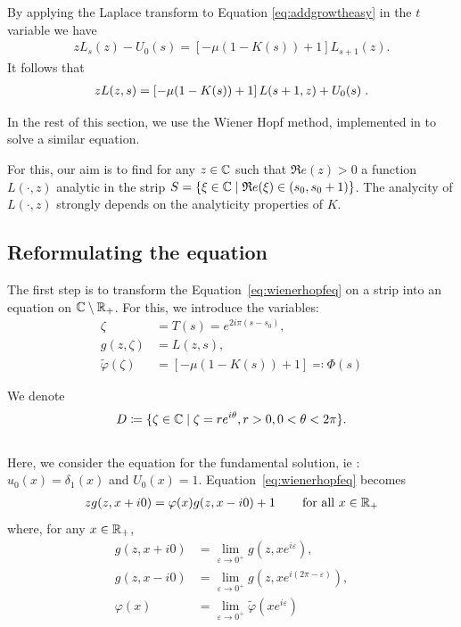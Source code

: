 \documentclass[11pt]{amsart}
\renewcommand{\Re}{\mathfrak{R}e}
\begin{document}
By applying the Laplace transform to Equation \eqref{eq:addgrowtheasy} in the $t$ variable we have 
\begin{align*}
    zL_s(z) - U_0(s) = \left[- \mu (1-K(s)) + 1\right] L_{s+1}(z).
\end{align*}
It follows that 
\begin{align}
    \label{eq:wienerhopfeq}
    zL(z,s) = \left[- \mu (1-K(s)) + 1\right] L(s+1,z) + U_0(s)
    \; .
\end{align} 


In the rest of this section, we use the Wiener Hopf method, implemented in \cite{escobedo2007fundamental} to solve a similar equation. 
\medskip

For this, our aim is to find for any $z \in \mathbb{C}$ such that $\Re(z) > 0$ a function $L(\cdot,z)$ analytic in the strip $S = \{\xi \in \CC \mid \Re(\xi) \in (s_0, s_0+1)\}$. 
The analycity of $L(\cdot,z)$ strongly depends on the analyticity properties of $K$.\\



\subsection{Reformulating the equation}

The first step is to transform the Equation~\eqref{eq:wienerhopfeq} on a strip into an equation on $\mathbb{C} \setminus \mathbb{R}_+$. For this, we introduce the variables:
    \begin{align}
        \zeta &= T(s) = e^{2i\pi(s-s_0)},\\
        g(z,\zeta) &= L(z,s), \\
        \tilde \varphi(\zeta) &= \left[- \mu (1-K(s)) + 1\right] \eqqcolon 
        \Phi(s)
        \label{def:Phi}
    \end{align}

We denote 
\begin{equation}\label{def:D}
D \coloneqq \{ \zeta \in \mathbb{C} \mid \zeta = re^{i\theta}, r > 0, 0 < \theta < 2\pi \}.
\end{equation}\\

Here, we consider the equation for the fundamental solution, ie : $u_0(x) = \delta_1(x)$ and $U_0(x) = 1$. Equation~\eqref{eq:wienerhopfeq} becomes
\begin{align}
    \label{eq:WH3.5}
    z g(z, x+i0) = \varphi(x)g(z, x-i0) + 1 \, \qquad \text{for all $x\in\mathbb{R}_+$}
\end{align}
where, for any $x \in \mathbb{R}_+$, 
\begin{align*}
    g(z, x+i0) &= \lim_{\varepsilon\to 0^+}  g(z, xe^{i\varepsilon}),\\
    g(z, x-i0) &= \lim_{\varepsilon\to 0^+}  g(z, xe^{i(2\pi-\varepsilon)}),\\
    \varphi(x) &= \lim_{\varepsilon\to 0^+}\tilde \varphi(xe^{i\varepsilon}) 
\end{align*}
\end{document}
